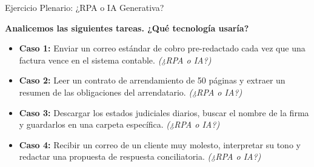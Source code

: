 \documentclass[aspectratio=169]{beamer}
\begin{document}
\begin{frame}{Ejercicio Plenario: ¿RPA o IA Generativa?}


\textbf{Analicemos las siguientes tareas. ¿Qué tecnología usaría?}

\begin{itemize}
  \item \textbf{Caso 1:} Enviar un correo estándar de cobro pre-redactado cada vez que una factura vence en el sistema contable. \textit{(¿RPA o IA?)}
  \item \textbf{Caso 2:} Leer un contrato de arrendamiento de 50 páginas y extraer un resumen de las obligaciones del arrendatario. \textit{(¿RPA o IA?)}
  \item \textbf{Caso 3:} Descargar los estados judiciales diarios, buscar el nombre de la firma y guardarlos en una carpeta específica. \textit{(¿RPA o IA?)}
  \item \textbf{Caso 4:} Recibir un correo de un cliente muy molesto, interpretar su tono y redactar una propuesta de respuesta conciliatoria. \textit{(¿RPA o IA?)}
\end{itemize}
\end{frame}
\end{document}
